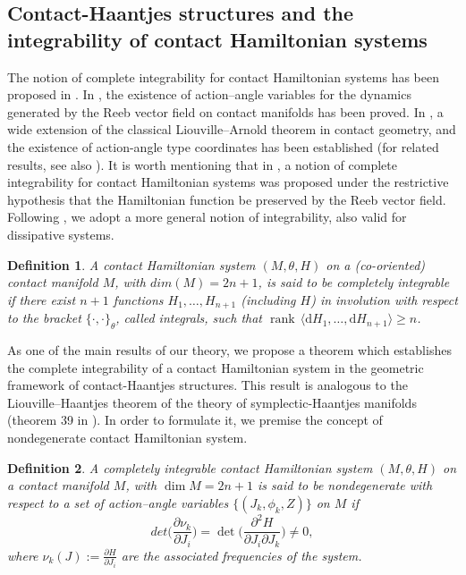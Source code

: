 \documentclass[10pt]{amsart}
\numberwithin{equation}{section}
\newcommand{\beq}{\begin{equation}}
\newcommand{\eeq}{\end{equation}}
\newcommand{\rd}{\mathrm{d}}
\DeclareMathOperator{\rank}{rank}
\newtheorem{definition}{Definition}
\theoremstyle{definition}
\begin{document}
\subsection{Contact-Haantjes structures and the integrability of contact Hamiltonian systems}
The notion of complete integrability for contact Hamiltonian systems has been proposed in \cite{KT2010contact, P1990TAMS,Jovanovic2015contact}. In \cite{M2003,M2005,M2014},  the existence of action--angle variables for the dynamics generated by the Reeb vector field on contact manifolds has been proved. In \cite{CLEL2025homogeneous,CLLL2023pr}, a wide extension of the classical Liouville--Arnold theorem \cite{Arnold1978} in contact geometry, and the existence of  action-angle type coordinates has been established (for related results, see also \cite{Jovanovic2012non,Zung2018conceptual}). It is worth mentioning that in \cite{B2011SIGMA}, a notion of complete integrability for contact Hamiltonian systems was proposed under the restrictive hypothesis that the Hamiltonian function be preserved by the Reeb vector field.   Following \cite{CLEL2025homogeneous,CLLL2023pr}, we adopt a more general notion of integrability, also valid for dissipative systems.
\begin{definition}
\label{def:20}
A contact Hamiltonian system $(M,\theta,H)$ on a (co-oriented) contact manifold $M$, with $dim(M)=2n+1$, is said to be completely integrable if there exist $n+1$ functions $H_{1},\ldots,H_{n+1}$ (including $H$) in involution with respect to the bracket $\{\cdot,\cdot\}_{\theta}$, called integrals, such that $\rank\, \langle \rd H_{1},\ldots,\rd H_{n+1}\rangle \geq n$. 
\end{definition} 

As one of the main results of our theory, we propose a theorem which establishes the complete integrability of a contact Hamiltonian system in the geometric framework of contact-Haantjes structures. This result is analogous to the Liouville--Haantjes theorem of the theory of symplectic-Haantjes manifolds (theorem 39 in \cite{TT2022AMPA}). In order to formulate it, we premise the concept of nondegenerate contact Hamiltonian system.
\begin{definition}
A completely integrable contact Hamiltonian system $(M,\theta,H)$ on a contact manifold $M$, with $\dim M=2n+1$ is said to be nondegenerate with respect to a set of action--angle variables $\{(J_k, \phi_k, Z)\}$ on $M$ if 
\beq
det \bigg( \frac{\partial \nu_k}{\partial J_i} \bigg)= \det \bigg( \frac{\partial^2 H}{\partial J_i \partial J_k} \bigg)\neq 0,
\eeq
where $\nu_k(J):= \frac{\partial H}{\partial J_i}$ are the associated frequencies of the system.
\end{definition}
\end{document}
